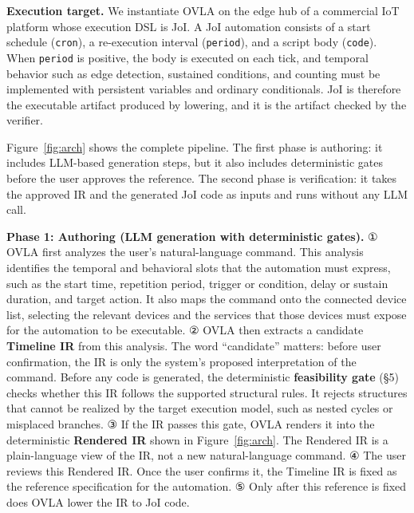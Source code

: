 \documentclass[sigconf,nonacm,anonymous,review]{acmart}
\begin{document}
\textbf{Execution target.} We instantiate OVLA on the edge hub of a commercial IoT platform whose execution DSL is JoI. A JoI automation consists of a start schedule (\texttt{cron}), a re-execution interval (\texttt{period}), and a script body (\texttt{code}). When \texttt{period} is positive, the body is executed on each tick, and temporal behavior such as edge detection, sustained conditions, and counting must be implemented with persistent variables and ordinary conditionals. JoI is therefore the executable artifact produced by lowering, and it is the artifact checked by the verifier.

Figure~\ref{fig:arch} shows the complete pipeline. The first phase is authoring: it includes LLM-based generation steps, but it also includes deterministic gates before the user approves the reference. The second phase is verification: it takes the approved IR and the generated JoI code as inputs and runs without any LLM call.

\textbf{Phase 1: Authoring (LLM generation with deterministic gates).} ① OVLA first analyzes the user's natural-language command. This analysis identifies the temporal and behavioral slots that the automation must express, such as the start time, repetition period, trigger or condition, delay or sustain duration, and target action. It also maps the command onto the connected device list, selecting the relevant devices and the services that those devices must expose for the automation to be executable. ② OVLA then extracts a candidate \textbf{Timeline IR} from this analysis. The word ``candidate'' matters: before user confirmation, the IR is only the system's proposed interpretation of the command. Before any code is generated, the deterministic \textbf{feasibility gate} (\S5) checks whether this IR follows the supported structural rules. It rejects structures that cannot be realized by the target execution model, such as nested cycles or misplaced branches. ③ If the IR passes this gate, OVLA renders it into the deterministic \textbf{Rendered IR} shown in Figure~\ref{fig:arch}. The Rendered IR is a plain-language view of the IR, not a new natural-language command. ④ The user reviews this Rendered IR. Once the user confirms it, the Timeline IR is fixed as the reference specification for the automation. ⑤ Only after this reference is fixed does OVLA lower the IR to JoI code.
\end{document}
